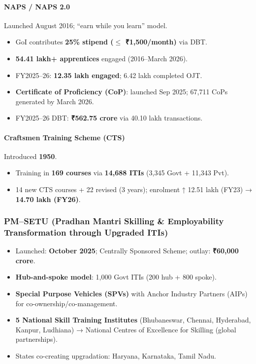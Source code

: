 \paragraph{NAPS / NAPS 2.0} Launched August 2016; ``earn while you learn'' model.
\begin{itemize}
  \item GoI contributes \textbf{25\% stipend ($\le$ ₹1,500/month)} via DBT.
  \item \textbf{54.41 lakh+ apprentices} engaged (2016--March 2026).
  \item FY2025--26: \textbf{12.35 lakh engaged}; 6.42 lakh completed OJT.
  \item \textbf{Certificate of Proficiency (CoP)}: launched Sep 2025; 67,711 CoPs generated by March 2026.
  \item FY2025--26 DBT: \textbf{₹562.75 crore} via 40.10 lakh transactions.
\end{itemize}

\paragraph{Craftsmen Training Scheme (CTS)} Introduced \textbf{1950}.
\begin{itemize}
  \item Training in \textbf{169 courses} via \textbf{14,688 ITIs} (3,345 Govt + 11,343 Pvt).
  \item 14 new CTS courses + 22 revised (3 years); enrolment ↑ 12.51 lakh (FY23) → \textbf{14.70 lakh (FY26)}.
\end{itemize}

\subsubsection*{PM--SETU (Pradhan Mantri Skilling \& Employability Transformation through Upgraded ITIs)}
\begin{itemize}
  \item Launched: \textbf{October 2025}; Centrally Sponsored Scheme; outlay: \textbf{₹60,000 crore}.
  \item \textbf{Hub-and-spoke model}: 1,000 Govt ITIs (200 hub + 800 spoke).
  \item \textbf{Special Purpose Vehicles (SPVs)} with Anchor Industry Partners (AIPs) for co-ownership/co-management.
  \item \textbf{5 National Skill Training Institutes} (Bhubaneswar, Chennai, Hyderabad, Kanpur, Ludhiana) → National Centres of Excellence for Skilling (global partnerships).
  \item States co-creating upgradation: Haryana, Karnataka, Tamil Nadu.
\end{itemize}


